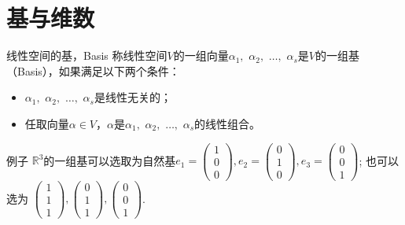 \section{基与维数}


\begin{frame}

\begin{block}{线性空间的基，Basis}
称线性空间$V$的一组向量$\alpha_1,$ $\alpha_2,$ $\ldots,$ $\alpha_s$是$V$的一组基（Basis），如果满足以下两个条件：
\begin{itemize}
\item $\alpha_1,$ $\alpha_2,$ $\ldots,$ $\alpha_s$是线性无关的；
\item 任取向量$\alpha\in V$，$\alpha$是$\alpha_1,$ $\alpha_2,$ $\ldots,$ $\alpha_s$的线性组合。
\end{itemize}
\end{block}

\pause

\begin{block}{例子}
$\mathbb{R}^3$的一组基可以选取为自然基\(\displaystyle e_1 = \begin{pmatrix} 1 \\ 0 \\ 0 \end{pmatrix}, e_2 = \begin{pmatrix} 0 \\ 1 \\ 0 \end{pmatrix}, e_3 = \begin{pmatrix} 0 \\ 0 \\ 1 \end{pmatrix}\); \newline
\pause
也可以选为
\(\displaystyle \begin{pmatrix} 1 \\ 1 \\ 1 \end{pmatrix}, \begin{pmatrix} 0 \\ 1 \\ 1 \end{pmatrix}, \begin{pmatrix} 0 \\ 0 \\ 1 \end{pmatrix}\).
\end{block}

\end{frame}

